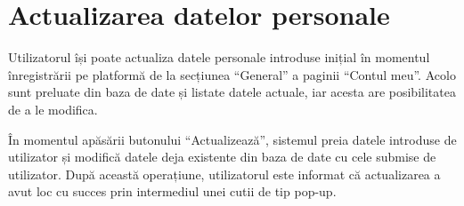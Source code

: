 \documentclass[12pt,a4paper]{report}
\begin{document}
\section{Actualizarea datelor personale}
\par
Utilizatorul își poate actualiza datele personale introduse inițial în momentul înregistrării pe platformă de la secțiunea  “General” a paginii  “Contul meu”. Acolo sunt preluate din baza de date și listate datele actuale, iar acesta are posibilitatea de a le modifica.
\\
\par
În momentul apăsării butonului “Actualizează”, sistemul preia datele introduse de utilizator și modifică datele deja existente din baza de date cu cele submise de utilizator. După această operațiune, utilizatorul este informat că actualizarea a avut loc cu succes prin intermediul unei cutii de tip pop-up.
\\
\end{document}
